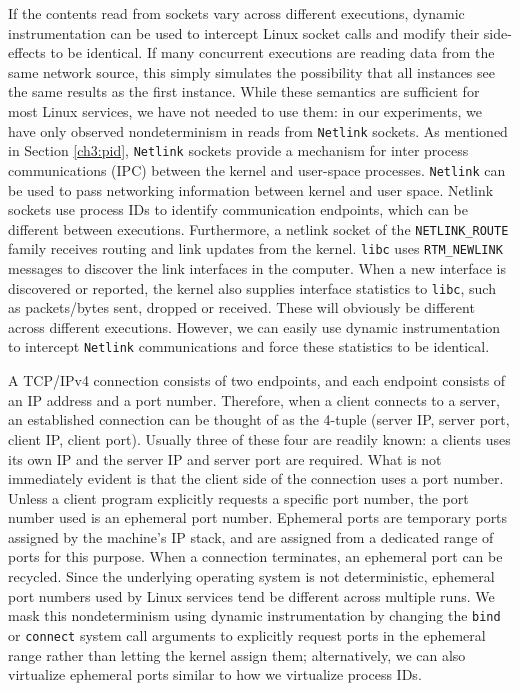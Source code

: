 If the contents read from sockets
vary across different executions, dynamic instrumentation can be used to 
intercept Linux socket calls
and modify their side-effects to be identical. If
many concurrent executions are reading data from the
same network source, this simply simulates the possibility that all instances
see the same results as the first instance. 
While these semantics are sufficient for most Linux services,
we have not needed to use them: in our experiments,
we have only observed nondeterminism
in reads from \texttt{Netlink} sockets.
As mentioned in Section \ref{ch3:pid},
\texttt{Netlink} sockets provide a 
mechanism for inter process communications (IPC)
between the kernel and user-space processes.
\texttt{Netlink} can be used to pass
networking information between kernel
and user space. Netlink sockets
use process IDs to identify
communication endpoints, which can
be different between executions.
Furthermore, a netlink 
socket of the \texttt{NETLINK\_ROUTE}
family receives routing and link updates
from the kernel. \texttt{libc} uses \texttt{RTM\_NEWLINK}
messages to discover the link interfaces 
in the computer. When a new interface
is discovered or reported, the kernel also supplies
interface statistics to \texttt{libc},
such as packets/bytes sent, dropped or
received. These will obviously be different
across different executions. However,
we can easily use dynamic instrumentation
to intercept \texttt{Netlink} communications
and force these statistics to be
identical.

A TCP/IPv4 connection consists of two endpoints,
and each endpoint consists of an IP address and a port
number. Therefore, when a client connects to a server,
an established connection can be thought of as the
4-tuple (server IP, server port, client IP, client port).
Usually three of these four are readily known:
a clients uses its own IP and the
server IP and server port are required. What is not
immediately evident is that the client
side of the connection uses a port number.
Unless a client program explicitly
requests a specific port number,
the port number used is an ephemeral port number.
Ephemeral ports are temporary ports
assigned by the machine's IP stack, 
and are assigned from a dedicated range of
ports for this purpose. When a connection
terminates, an ephemeral port can be recycled.
Since the underlying operating system
is not deterministic, ephemeral
port numbers used by Linux services
tend be different across multiple 
runs. We mask this nondeterminism 
using dynamic instrumentation by
changing the \texttt{bind} or \texttt{connect} 
system call arguments to explicitly request ports
in the ephemeral range rather than letting the kernel 
assign them; alternatively,
we can also virtualize ephemeral ports
similar to how we virtualize process IDs.

